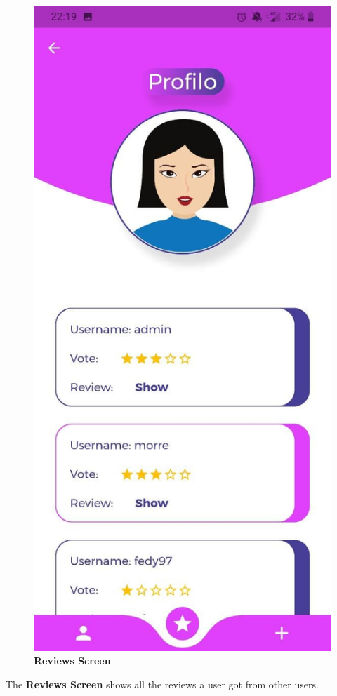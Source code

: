 \documentclass[../../dd.tex]{subfiles}
\begin{document}
    \begin{figure}[H]
        \centering
        \includegraphics[height=.6\textheight]{../../assets/screens/reviews.jpg}
        \caption{\textbf{Reviews Screen}}\label{fig:figure}
    \end{figure}
    \begin{center}
        The \textbf{Reviews Screen} shows all the reviews a user got from other users.
    \end{center}
\end{document}
